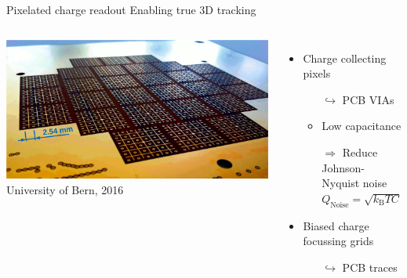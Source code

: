 \documentclass[]{beamer}
\newcommand*{\m}{\mathrm}
\newcommand*{\emphcoltitle}{blue}
\begin{document}
\begin{frame}{Pixelated charge readout}{\color{\emphcoltitle} Enabling true 3D tracking}
	\begin{columns}[c]
		\centering
		\includegraphics[width=\textwidth]{viper/pixies}\\
		{\tiny University of Bern, 2016}\\
		\begin{itemize}
			\item Charge collecting pixels
			\begin{itemize}
				\item[$\hookrightarrow$] PCB VIAs
				\item Low capacitance
				\item[$\Rightarrow$] Reduce Johnson-Nyquist noise $Q_{\m{Noise}} = \sqrt{k_{\m{B}}TC}$
			\end{itemize}
			\item Biased charge focussing grids
			\begin{itemize}
				\item[$\hookrightarrow$] PCB traces
			\end{itemize}
		\end{itemize}
	\end{columns}
\end{frame}
\end{document}
